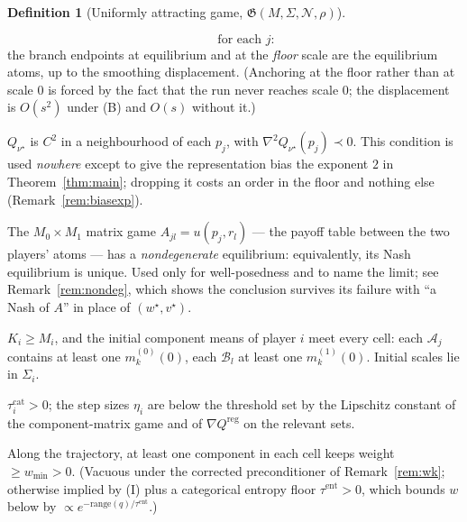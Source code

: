 \documentclass[11pt]{article}
\theoremstyle{definition}
\newtheorem{definition}{Definition}
\newcommand{\cA}{\mathcal{A}}
\newcommand{\cB}{\mathcal{B}}
\newcommand{\cN}{\mathcal{N}}
\begin{document}
\begin{definition}[Uniformly attracting game, $\mathfrak{G}(M,\Sigma,\cN,\rho)$]
\begin{conditions}
\begin{equation}
    \qquad \text{for each } j :
  \end{equation}
  the branch endpoints at equilibrium and at the \emph{floor} scale are the
  equilibrium atoms, up to the smoothing displacement. (Anchoring at the floor
  rather than at scale $0$ is forced by the fact that the run never reaches
  scale $0$; the displacement is $O(s^2)$ under (B) and $O(s)$ without it.)
\item[\textbf{(B) Atom regularity} --- \emph{for the bias exponent only}.]
  $Q_{\nu^\star}$ is $C^2$ in a neighbourhood of each $p_j$, with
  $\nabla^2 Q_{\nu^\star}(p_j) \prec 0$. This condition is used \emph{nowhere}
  except to give the representation bias the exponent $2$ in
  Theorem~\ref{thm:main}; dropping it costs an order in the floor and nothing
  else (Remark~\ref{rem:biasexp}).
\item[\textbf{(I) Nondegeneracy.}] The $M_0 \times M_1$ matrix game
  $A_{jl} = u(p_j, r_l)$ --- the payoff table between the two players' atoms ---
  has a \emph{nondegenerate} equilibrium: equivalently, its Nash equilibrium is
  unique. Used only for well-posedness and to name the limit; see
  Remark~\ref{rem:nondeg}, which shows the conclusion survives its failure with
  ``a Nash of $A$'' in place of $(w^\star, v^\star)$.
\item[\textbf{(K) Capacity and covering.}] $K_i \ge M_i$, and the initial
  component means of player $i$ meet every cell: each $\cA_j$ contains at least
  one $m^{(0)}_k(0)$, each $\cB_l$ at least one $m^{(1)}_k(0)$. Initial scales lie
  in $\Sigma_i$.
\item[\textbf{(S) Algorithmic caps.}] $\tau^{\mathrm{cat}}_i > 0$; the step sizes
  $\eta_i$ are below the threshold set by the Lipschitz constant of the
  component-matrix game and of $\nabla Q^{\mathrm{reg}}$ on the relevant sets.
\item[\textbf{(W) Weight non-degeneracy.}] Along the trajectory,
  at least one component in each cell keeps weight $\ge w_{\min} > 0$. (Vacuous
  under the corrected preconditioner of Remark~\ref{rem:wk}; otherwise implied by
  (I) plus a categorical entropy floor $\tau^{\mathrm{ent}} > 0$, which bounds
  $w$ below by $\propto e^{-\mathrm{range}(q)/\tau^{\mathrm{ent}}}$.)
\end{conditions}
\end{definition}
\end{document}
